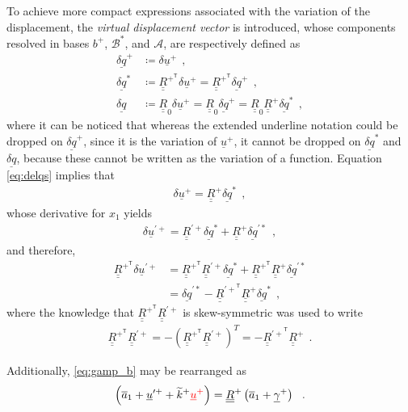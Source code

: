\documentclass[12pt,a4paper,oneside,english]{abntex2} %
\newcommand{\fix}[1]{{\color{red}#1}}
\newcommand{\vect}[1]{\underline{#1}}
\newcommand{\uvec}[1]{\overline{#1}}
\def\tens#1{\underline{\underline{#1}}}
\def\til#1{\widetilde{#1}}
\def\lp{\left(}
\def\rp{\right)}
\def\T{\mathsf{T}}
\def\A{\mathcal{A}}
\def\bp{b^+}
\def\B*{\mathcal{B}^*}
\def\xo{x_1}
\def\aone{\uvec{a}_1}
\def\R{\tens{R}}
\def\Rp{\R^+}
\def\RpT{\R^{+^\T}}
\def\Rpprime{\R^{\prime +}}
\def\RpprimeT{\R^{{\prime +}^\T}}
\def\Rz{\R_0}
\def\u{\vect{u}}
\def\uplus{\u^{+}}
\def\upprime{\u^{\prime+}}
\def\gam{\vect{\gamma}}
\def\gamp{\gam^{+}}
\def\ktil{\til{k}}
\def\ktilp{\ktil^{+}}
\def\delq{\vect{\delta q}}
\def\delqp{\delq^+}
\def\delqs{\delq^*}
\def\delqps{\delq^{\prime*}}
\begin{document}
\begin{apendicesenv}
To achieve more compact expressions associated with the variation of the displacement, the \textit{virtual displacement vector} is introduced, whose components resolved in bases $\bp$, $\B*$, and $\A$, are respectively defined as
\begin{align}
    \delqp &\coloneqq \delta\uplus \ \ ,
    \label{eq:delqp} 
    \\
    \delqs &\coloneqq \RpT\delta\uplus  = \RpT\delqp \ \ ,
    \label{eq:delqs}	
    \\
    \delq &\coloneqq \Rz\delta\uplus = \Rz\delqp = \Rz\Rp\delqs \ \ ,
    \label{eq:delq}
\end{align}
where it can be noticed that whereas the extended underline notation could be dropped on $\delqp$, since it is the variation of $\uplus$, it cannot be dropped on $\delqs$ and $\delq$, because these cannot be written as the variation of a function. Equation \eqref{eq:delqs} implies that 
\begin{align}
    \delta\uplus = \Rp\delqs \ \ ,
    \label{eq:deluplus}
\end{align}
whose derivative for $\xo$ yields 
\begin{align}
    \delta\upprime = \Rpprime\delqs + \Rp\delqps \ \ ,
    \label{eq:delupprime}
\end{align}
and therefore,
\begin{align}
    \RpT\delta\upprime &= \RpT\Rpprime\delqs + \RpT\Rp\delqps \nonumber 
    \\
    &= \delqps - \RpprimeT\Rp\delqs \ \ ,
    \label{eq:RpTdelupprime}
\end{align}
where the knowledge that $\RpT\Rpprime$ is skew-symmetric was used to write 
\begin{align}
\RpT\Rpprime = -\lp\RpT\Rpprime\rp^T = -\RpprimeT\Rp \ \ . 
\end{align}

Additionally, \cref{eq:gamp_b} may be rearranged as
\begin{align}
    \lp\aone+\upprime+\ktilp\fix{\uplus}\rp = \Rp\lp\aone+\gamp\rp \ \ .
    \label{eq:gamp_b_rearranged}
\end{align}


\end{apendicesenv}
\end{document}
